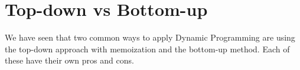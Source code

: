 \section{Top-down vs Bottom-up}

We have seen that two common ways to apply Dynamic Programming are using the top-down approach with memoization
and the bottom-up method. Each of these have their own pros and cons. 